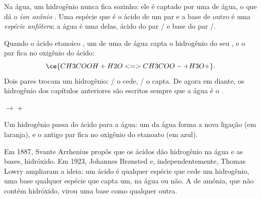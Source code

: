 \begin{definition}\label{def:g12:ka-and-pka:oxonium}
Na água, um  hidrogênio nunca fica sozinho: ele é captado por uma
 de água, o que dá o \emph{íon oxônio}
. Uma espécie que é o ácido de um par e a base de outro é uma
\emph{espécie anfótera}; a água é uma delas,
ácido do par / e base do par /.
\end{definition}

\begin{example}\label{ex:g12:ka-and-pka:acid-water}
Quando o ácido etanoico , um  de uma 
de água capta o hidrogênio do seu , e o par  fica no
oxigênio do ácido:
\[
  \ce{CH3COOH + H2O <=> CH3COO- + H3O+} .
\]
Dois pares trocam um  hidrogênio: / o cede,
/ o capta. De agora em diante, os  hidrogênio dos
capítulos anteriores são escritos  sempre que a água é o
.
\end{example}

\begin{omfigure}
\qquad
{}
\qquad$\longrightarrow$\qquad
{}\quad$+$\quad{}

{\small Um  hidrogênio passa do ácido para a água: um 
da água forma a nova ligação  (em laranja), e o antigo par
 fica no oxigênio do  etanoato (em azul).}
\end{omfigure}

\begin{history}
Em 1887, Svante Arrhenius propôs que os ácidos dão  hidrogênio na
água e as bases,  hidróxido. Em 1923, Johannes Brønsted e,
independentemente, Thomas Lowry ampliaram a ideia: um ácido é qualquer
espécie que cede um  hidrogênio, uma base qualquer espécie que capta
um, na água ou não. A  de amônia, que não contém hidróxido,
virou uma base como qualquer outra.
\end{history}

